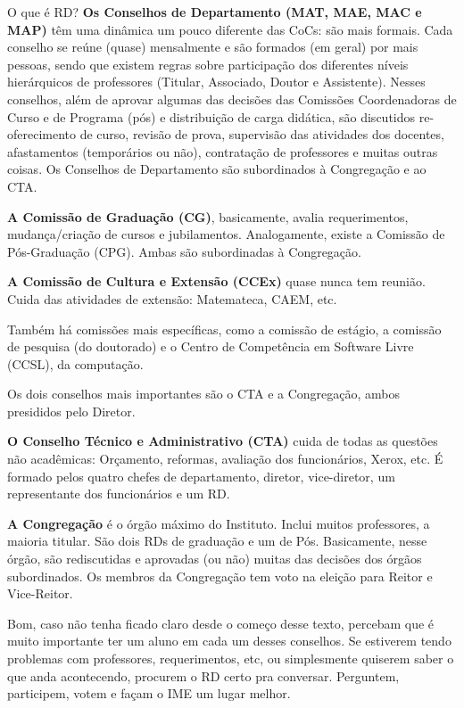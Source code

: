 \begin{secao}{O que é RD?}
{\bf Os Conselhos de Departamento (MAT, MAE, MAC e MAP)} têm uma dinâmica um
pouco diferente das CoCs: são mais formais. Cada conselho se reúne (quase)
mensalmente e são formados (em geral) por mais pessoas, sendo que existem
regras sobre participação dos diferentes níveis hierárquicos de
professores (Titular, Associado, Doutor e Assistente). Nesses conselhos, além
de aprovar algumas das decisões das Comissões Coordenadoras de Curso e de
Programa (pós) e distribuição de carga didática, são discutidos re-oferecimento
de curso, revisão de prova, supervisão das atividades dos docentes,
afastamentos (temporários ou não), contratação de professores e muitas outras
coisas.
Os Conselhos de Departamento são subordinados à Congregação e ao CTA.

{\bf A Comissão de Graduação (CG)}, basicamente, avalia requerimentos,
mudança/criação de cursos e jubilamentos. Analogamente, existe a Comissão de
Pós-Graduação (CPG). Ambas são subordinadas à Congregação.

{\bf A Comissão de Cultura e Extensão (CCEx)} quase nunca tem reunião. Cuida
das atividades de extensão: Matemateca, CAEM, etc.

Também há comissões mais específicas, como a comissão de estágio, a comissão de 
pesquisa (do doutorado) e o Centro de Competência em Software Livre (CCSL), da computação.

Os dois conselhos mais importantes são o CTA e a Congregação, ambos presididos
pelo Diretor.

{\bf O Conselho Técnico e Administrativo (CTA)} cuida de todas as questões não
acadêmicas: Orçamento, reformas, avaliação dos funcionários, Xerox, etc. É 
formado pelos quatro chefes de departamento, diretor, vice-diretor, um
representante dos funcionários e um RD.

{\bf A Congregação} é o órgão máximo do Instituto. Inclui muitos professores, a
maioria titular. São dois RDs de graduação e um de Pós. Basicamente,
nesse órgão, são rediscutidas e aprovadas (ou não) muitas das decisões
dos órgãos subordinados. Os membros da Congregação tem voto na eleição para
Reitor e Vice-Reitor.


Bom, caso não tenha ficado claro desde o começo desse texto, percebam que é 
muito importante ter um aluno em cada um desses conselhos. Se estiverem tendo 
problemas com professores, requerimentos, etc, ou simplesmente quiserem saber 
o que anda acontecendo, procurem o RD certo pra conversar. Perguntem, participem, 
votem e façam o IME um lugar melhor.

\end{secao}
